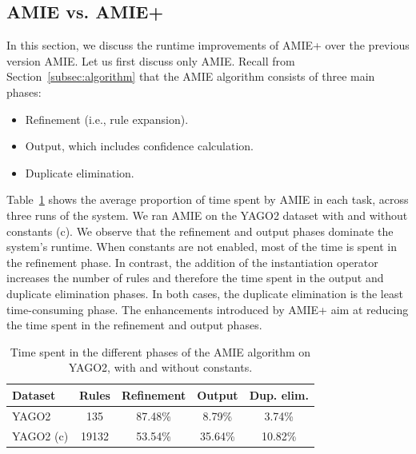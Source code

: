 \subsection{AMIE vs. AMIE+}\label{amiepm}

In this section, we discuss the runtime improvements of AMIE+ over the previous version AMIE.
Let us first discuss only AMIE. Recall from Section~\ref{subsec:algorithm} that the AMIE algorithm consists of three main phases:
\begin{itemize}
 \item Refinement (i.e., rule expansion).
 \item Output, which includes confidence calculation. %
 \item Duplicate elimination.
\end{itemize}

Table~\ref{timeProportion} shows the average proportion of time spent by AMIE in each task, across
three runs of the system.
We ran AMIE on the YAGO2 dataset with and without constants (c).
We observe that the refinement and output phases dominate the system's runtime.
When constants are not enabled, most of the time is spent in the refinement phase. In contrast,
the addition of the instantiation operator increases the number of rules and therefore the time
spent in the output and duplicate elimination phases. In both cases,
the duplicate elimination is the least time-consuming phase.
The enhancements introduced by AMIE+ aim at reducing the time spent in the
refinement and output phases.
\begin{center}
\begin{table}
\footnotesize
\begin{tabular}{|l|c|c|c|c|}
\hline
Dataset		& Rules	&  Refinement	& Output 	& Dup. elim.  \\ \hline
YAGO2  		& 135	&  87.48\% 	& 8.79\% 	& 3.74\% \\
YAGO2 (c)  	& 19132	&  53.54\%	& 35.64\% 	& 10.82\% \\ \hline
\end{tabular}
\caption{Time spent in the different phases of the AMIE algorithm on YAGO2, with and without constants.}
\label{timeProportion}
\end{table}
\end{center}


